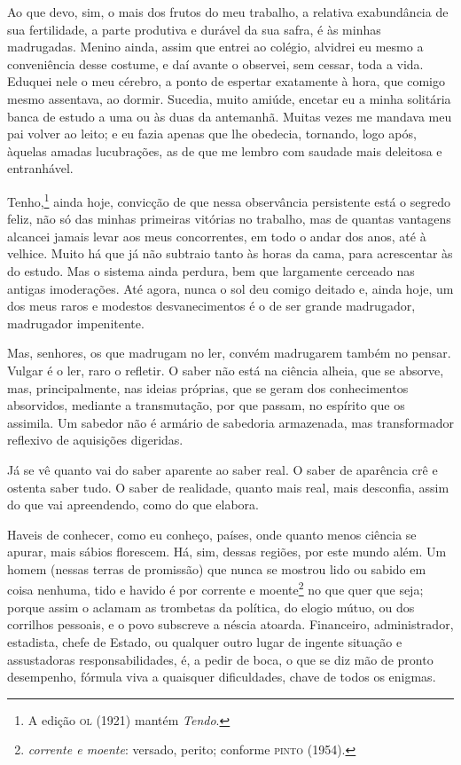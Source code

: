 Ao que devo, sim, o mais dos frutos do meu trabalho, a relativa
exabundância de sua fertilidade, a parte produtiva e durável da sua
safra, é às minhas madrugadas. Menino ainda, assim que entrei ao
colégio, alvidrei eu mesmo a conveniência desse costume, e daí avante o
observei, sem cessar, toda a vida. Eduquei nele o meu cérebro, a ponto
de espertar exatamente à hora, que comigo mesmo assentava, ao dormir.
Sucedia, muito amiúde, encetar eu a minha solitária banca de estudo a
uma ou às duas da antemanhã. Muitas vezes me mandava meu pai volver ao
leito; e eu fazia apenas que lhe obedecia, tornando, logo após, àquelas
amadas lucubrações, as de que me lembro com saudade mais deleitosa e
entranhável.

Tenho,\footnote{ A edição \textsc{ol} (1921) mantém \textit{Tendo}.} ainda
hoje, convicção de que nessa observância persistente está o segredo
feliz, não só das minhas primeiras vitórias no trabalho, mas de quantas
vantagens alcancei jamais levar aos meus concorrentes, em todo o andar
dos anos, até à velhice. Muito há que já não subtraio tanto às horas da
cama, para acrescentar às do estudo. Mas o sistema ainda perdura, bem
que largamente cerceado nas antigas imoderações. Até agora, nunca o sol
deu comigo deitado e, ainda hoje, um dos meus raros e modestos
desvanecimentos é o de ser grande madrugador, madrugador impenitente.

Mas, senhores, os que madrugam no ler, convém madrugarem também no
pensar. Vulgar é o ler, raro o refletir. O saber não está na ciência
alheia, que se absorve, mas, principalmente, nas ideias próprias, que
se geram dos conhecimentos absorvidos, mediante a transmutação, por que
passam, no espírito que os assimila. Um sabedor não é armário de
sabedoria armazenada, mas transformador reflexivo de aquisições digeridas.

Já se vê quanto vai do saber aparente ao saber real. O saber de
aparência crê e ostenta saber tudo. O saber de realidade, quanto mais
real, mais desconfia, assim do que vai apreendendo, como do que elabora.

Haveis de conhecer, como eu conheço, países, onde quanto menos
ciência se apurar, mais sábios florescem. Há, sim, dessas regiões, por
este mundo além. Um homem (nessas terras de promissão) que nunca se
mostrou lido ou sabido em coisa nenhuma, tido e havido é por corrente e
moente\footnote{ \textit{corrente e moente}: versado, perito; conforme
\textsc{pinto} (1954).} no que quer que seja; porque assim o aclamam as trombetas
da política, do elogio mútuo, ou dos corrilhos pessoais, e o povo
subscreve a néscia atoarda. Financeiro, administrador, estadista, chefe
de Estado, ou qualquer outro lugar de ingente situação e assustadoras
responsabilidades, é, a pedir de boca, o que se diz mão de pronto
desempenho, fórmula viva a quaisquer dificuldades, chave de todos os enigmas.


